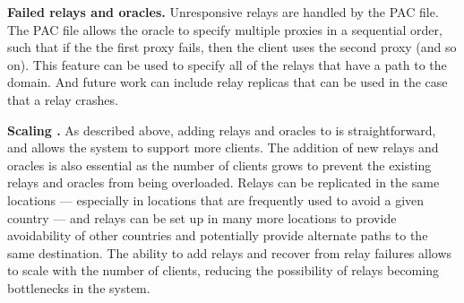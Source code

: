 {\bf Failed relays and oracles.} Unresponsive relays are handled
by the PAC file.  The PAC file allows the oracle to specify multiple
proxies in a sequential order, such that if the the first proxy fails,
then the client uses the second proxy (and so on).  This feature can
be used to specify all of the relays that have a path to the domain.
And future work can include relay replicas that can be used in the
case that a relay crashes.  

{\bf Scaling \system{}.}  As described above, adding relays and oracles to \system{} 
is straightforward, and allows the system to support more clients.  The addition of new 
relays and oracles is also essential as the number of clients grows to prevent the existing 
relays and oracles from being overloaded.  Relays can be replicated in the same locations --- 
especially in locations that are frequently used to avoid a given country --- and relays can 
be set up in many more locations to provide avoidability of other countries and potentially provide 
alternate paths to the same destination.  The ability to add relays and recover from relay failures 
allows \system{} to scale with the number of clients, reducing the possibility of relays becoming 
bottlenecks in the system.


